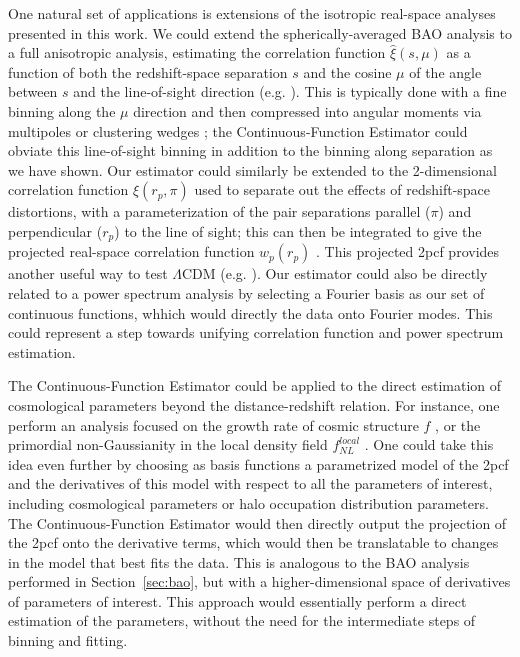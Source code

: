 \documentclass[modern]{aastex62}
\newcommand{\cf}{2pcf\xspace}
\newcommand{\Est}{The Continuous-Function Estimator\xspace}
\newcommand{\est}{the Continuous-Function Estimator\xspace}
\begin{document}
One natural set of applications is extensions of the isotropic real-space analyses presented in this work.
We could extend the spherically-averaged BAO analysis to a full anisotropic analysis, estimating the correlation function $\hat{\xi}(s, \mu)$ as a function of both the redshift-space separation $s$ and the cosine $\mu$ of the angle between $s$ and the line-of-sight direction (e.g. \citealt{Anderson2013}).
This is typically done with a fine binning along the $\mu$ direction and then compressed into angular moments via multipoles or clustering wedges \citep{Kazin2012}; \est could obviate this line-of-sight binning in addition to the binning along separation as we have shown.
Our estimator could similarly be extended to the 2-dimensional correlation function  $\hat{\xi}(r_p, \pi)$ used to separate out the effects of redshift-space distortions, with a parameterization of the pair separations parallel ($\pi$) and perpendicular ($r_p$) to the line of sight; this can then be integrated to give the projected real-space correlation function $w_p(r_p)$ \citep{DavisPeebles1983}.
This projected \cf provides another useful way to test $\Lambda$CDM (e.g. \citealt{Nuza2013}).
Our estimator could also be directly related to a power spectrum analysis by selecting a Fourier basis as our set of continuous functions, whhich would directly the data onto Fourier modes.
This could represent a step towards unifying correlation function and power spectrum estimation.

\Est could be applied to the direct estimation of cosmological parameters beyond the distance-redshift relation.
For instance, one perform an analysis focused on the growth rate of cosmic structure $f$ \citep{Satpathy2016, Reid2018}, or the primordial non-Gaussianity in the local density field $f^{local}_{NL}$ \citep{Karagiannis2014}.
One could take this idea even further by choosing as basis functions a parametrized model of the \cf and the derivatives of this model with respect to all the parameters of interest, including cosmological parameters or halo occupation distribution parameters.
\Est would then directly output the projection of the \cf onto the derivative terms, which would then be translatable to changes in the  model that best fits the data.
This is analogous to the BAO analysis performed in Section~\ref{sec:bao}, but with a higher-dimensional space of derivatives of parameters of interest.
This approach would essentially perform a direct estimation of the parameters, without the need for the intermediate steps of binning and fitting.
\end{document}
